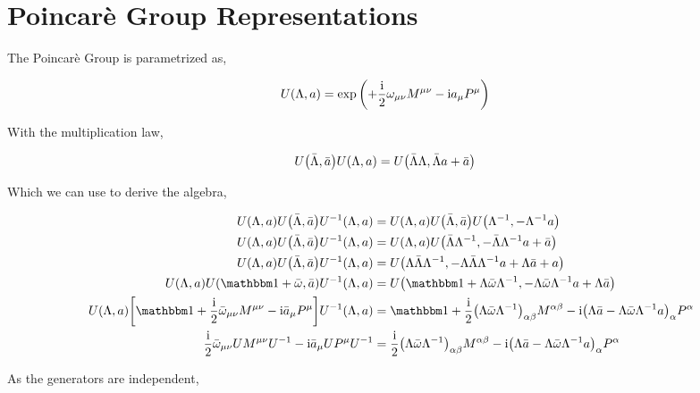 \section{Poincarè Group Representations}

The Poincarè Group is parametrized as,

\begin{align}
    U\qty(\Lambda, a) & = \exp\qty(+\frac{\textnormal{i}} 2\omega_{\mu\nu}M^{\mu\nu}-\textnormal{i} a_\mu P^\mu)\nonumber
\end{align}

With the multiplication law,

\begin{align}
    U\qty(\bar \Lambda, \bar a)U\qty(\Lambda, a) & = U\qty(\bar\Lambda\Lambda, \bar\Lambda a+\bar a) \nonumber
\end{align}

Which we can use to derive the algebra,

\begin{align}
    U\qty(\Lambda,a)U\qty(\bar\Lambda,\bar a)U^{-1}\qty(\Lambda,a)&=U\qty(\Lambda,a)U\qty(\bar\Lambda,\bar a)U\qty(\Lambda^{-1},-\Lambda^{-1}a)\nonumber\\
    U\qty(\Lambda,a)U\qty(\bar\Lambda,\bar a)U^{-1}\qty(\Lambda,a)&=U\qty(\Lambda,a)U\qty(\bar\Lambda\Lambda^{-1},-\bar\Lambda\Lambda^{-1}a+\bar a)\nonumber\\
    U\qty(\Lambda,a)U\qty(\bar\Lambda,\bar a)U^{-1}\qty(\Lambda,a)&=U\qty(\Lambda\bar\Lambda\Lambda^{-1},-\Lambda\bar\Lambda\Lambda^{-1}a+\Lambda\bar a+a)\nonumber\\
    U\qty(\Lambda,a)U\qty(\mathbbm 1+\bar\omega,\bar a)U^{-1}\qty(\Lambda,a)&=U\qty(\mathbbm 1 +\Lambda\bar\omega\Lambda^{-1},-\Lambda\bar\omega\Lambda^{-1}a+\Lambda\bar a)\nonumber\\
    U\qty(\Lambda,a)\qty[\mathbbm 1 +\frac\im 2{\bar\omega}_{\mu\nu}M^{\mu\nu}-\im {\bar a}_\mu P^\mu]U^{-1}\qty(\Lambda,a)&=\mathbbm 1 +\frac\im 2\qty(\Lambda\bar\omega\Lambda^{-1})_{\alpha\beta}M^{\alpha\beta}-\im \qty(\Lambda \bar a-\Lambda \bar \omega\Lambda^{-1} a)_\alpha P^\alpha \nonumber\\
    \frac\im 2{\bar\omega}_{\mu\nu}UM^{\mu\nu}U^{-1}-\im {\bar a}_\mu UP^\mu U^{-1}&=\frac\im 2\qty(\Lambda\bar\omega\Lambda^{-1})_{\alpha\beta}M^{\alpha\beta}-\im \qty(\Lambda \bar a-\Lambda \bar \omega\Lambda^{-1} a)_\alpha P^\alpha \nonumber
\end{align}

As the generators are independent,

